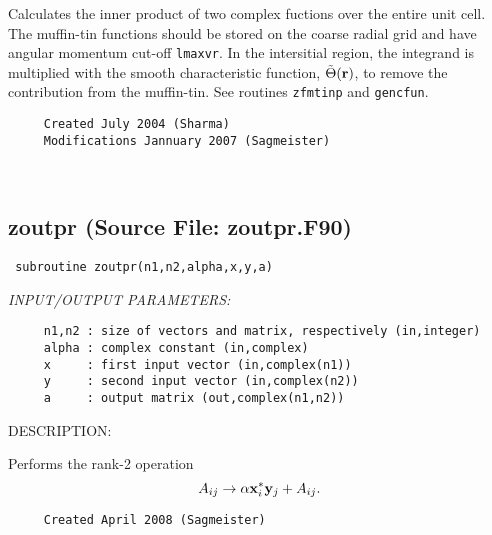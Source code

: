 \documentclass[11pt]{article}
\begin{document}
     Calculates the inner product of two complex fuctions over the entire unit
     cell. The muffin-tin functions should be stored on the coarse radial grid
     and have angular momentum cut-off {\tt lmaxvr}. In the intersitial region,
     the integrand is multiplied with the smooth characteristic function,
     $\tilde{\Theta}({\bf r})$, to remove the contribution from the muffin-tin.
     See routines {\tt zfmtinp} and {\tt gencfun}.
  
\begin{verbatim}     Created July 2004 (Sharma)
     Modifications Jannuary 2007 (Sagmeister)\end{verbatim}


 
 
\mbox{}\hrulefill\ 
 
\subsection{zoutpr (Source File: zoutpr.F90)}


\begin{verbatim} subroutine zoutpr(n1,n2,alpha,x,y,a)\end{verbatim}{\em INPUT/OUTPUT PARAMETERS:}
\begin{verbatim}     n1,n2 : size of vectors and matrix, respectively (in,integer)
     alpha : complex constant (in,complex)
     x     : first input vector (in,complex(n1))
     y     : second input vector (in,complex(n2))
     a     : output matrix (out,complex(n1,n2))\end{verbatim}
{\sf DESCRIPTION:\\ }


     Performs the rank-2 operation
     $$ A_{ij}\rightarrow\alpha{\bf x}_i^*{\bf y}_j+A_{ij}. $$
  
\begin{verbatim}     Created April 2008 (Sagmeister)\end{verbatim}

\end{document}
